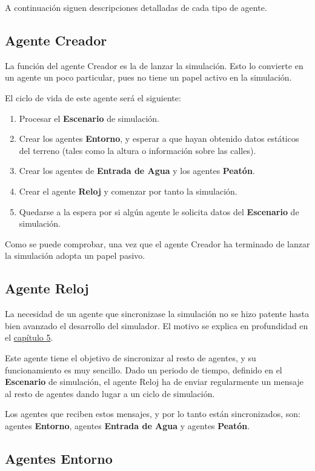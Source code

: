 A continuación siguen descripciones detalladas de cada tipo de agente.

\subsection{Agente Creador}

La función del agente Creador es la de lanzar la simulación. Esto lo convierte
en un agente un poco particular, pues no tiene un papel activo en la
simulación.

El ciclo de vida de este agente será el siguiente:

\begin{enumerate}
 \item Procesar el {\bf Escenario} de simulación.
 \item Crear los agentes {\bf Entorno}, y esperar a que hayan obtenido datos
estáticos del terreno (tales como la altura o información sobre las calles).
 \item Crear los agentes de {\bf Entrada de Agua} y los agentes {\bf Peatón}.
 \item Crear el agente {\bf Reloj} y comenzar por tanto la simulación.
 \item Quedarse a la espera por si algún agente le solicita datos del
{\bf Escenario} de simulación.
\end{enumerate}

Como se puede comprobar, una vez que el agente Creador ha terminado de lanzar
la simulación adopta un papel pasivo.

\subsection{Agente Reloj}

La necesidad de un agente que sincronizase la simulación no se hizo patente
hasta bien avanzado el desarrollo del simulador. El motivo se explica en
profundidad en el \hyperref[cap5]{capítulo 5}.

Este agente tiene el objetivo de sincronizar al resto de agentes, y su
funcionamiento es muy sencillo. Dado un periodo de tiempo, definido en el
{\bf Escenario} de simulación, el agente Reloj ha de enviar regularmente un
mensaje al resto de agentes dando lugar a un ciclo de simulación.

Los agentes que reciben estos mensajes, y por lo tanto están sincronizados,
son: agentes {\bf Entorno}, agentes {\bf Entrada de Agua} y agentes {\bf
Peatón}.

\subsection{Agentes Entorno}

